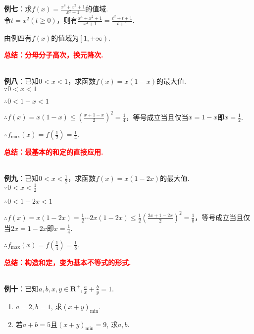 \documentclass[8pt]{article}
\begin{document}
				\textbf{例七}：求$\displaystyle f(x)=\frac{x^4+x^2+1}{x^2+1}$的值域.
					~\\

					令$t=x^2 (t\geq 0)$，则有$\displaystyle \frac{x^4+x^2+1}{x^2+1}=\frac{t^2+t+1}{t+1}.$

					由例四有$f(x)$的值域为$\left[1, +\infty\right).$

					\textcolor{red}{\textbf{总结：分母分子高次，换元降次.}}

				~\\

				\textbf{例八}：已知$0<x<1$，求函数$f(x)=x(1-x)$的最大值.
					~\\

					$\because 0<x<1$

					$\therefore 0<1-x<1$

					$\therefore \displaystyle f(x)=x(1-x)\leq \left(\frac{x+1-x}{2}\right)^2=\frac{1}{4}$，等号成立当且仅当$x=1-x$即$x=\displaystyle \frac{1}{2}$.

					$\therefore \displaystyle f_{\max}(x)=f\left(\frac{1}{2}\right)=\frac{1}{4}.$

					\textcolor{red}{\textbf{总结：最基本的和定的直接应用.}}

				~\\

				\textbf{例九}：已知$\displaystyle 0<x<\frac{1}{2}$，求函数$f(x)=x(1-2x)$的最大值.
					~\\

					$\because \displaystyle 0<x<\frac{1}{2}$

					$\therefore 0<1-2x<1$

					$\therefore \displaystyle f(x)=x(1-2x)=\frac{1}{2}\cdots 2x(1-2x) \leq \frac{1}{2} \left(\frac{2x+1-2x}{2}\right)^2=\frac{1}{8}$，等号成立当且仅当$2x=1-2x$即$x=\frac{1}{4}$.

					$\therefore \displaystyle f_{\max}(x)=f\left(\frac{1}{4}\right)=\frac{1}{8}.$

					\textcolor{red}{\textbf{总结：构造和定，变为基本不等式的形式.}}

				~\\

				\textbf{例十}：已知$a, b, x, y \in \mathbf{R}^{+}, \displaystyle \frac{a}{x}+\frac{b}{y}=1.$
					\begin{enumerate}[label=(\arabic*)]
						\item $a=2, b=1$, 求$(x+y)_{\min}$.
						\item 若$a+b=5$且$(x+y)_{\min}=9$, 求$a, b$.
					\end{enumerate}
\end{document}
